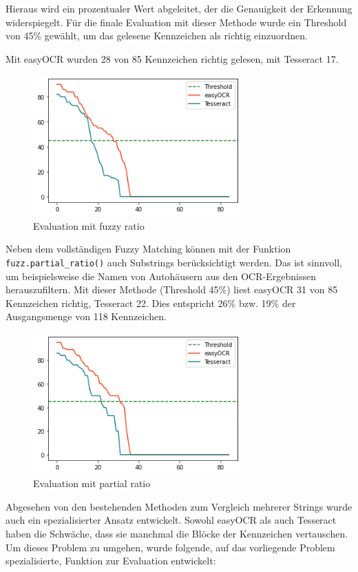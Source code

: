 Hieraus wird ein prozentualer Wert abgeleitet, der die Genauigkeit der Erkennung widerspiegelt.
Für die finale Evaluation mit dieser Methode wurde ein Threshold von 45\% gewählt, um das gelesene Kennzeichen als richtig einzuordnen.

Mit easyOCR wurden 28 von 85 Kennzeichen richtig gelesen, mit Tesseract 17.
\begin{figure}[H]
		\centering
\includegraphics[width=8cm]{./img/evaluation_fuzzy_ratio.png}
\caption{Evaluation mit fuzzy ratio}
\end{figure}


Neben dem vollständigen Fuzzy Matching können mit der Funktion \lstinline{fuzz.partial_ratio()} auch Substrings berücksichtigt werden.
Das ist sinnvoll, um beispielsweise die Namen von Autohäusern aus den OCR-Ergebnissen herauszufiltern.
Mit dieser Methode (Threshold 45\%) liest easyOCR 31 von 85 Kennzeichen richtig, Tesseract 22. Dies entspricht 26\% bzw. 19\% der Ausgangsmenge von 118 Kennzeichen.
\begin{figure}[H]
		\centering
\includegraphics[width=8cm]{./img/evaluation_partial_ratio.png}
\caption{Evaluation mit partial ratio}
\end{figure}


Abgesehen von den bestehenden Methoden zum Vergleich mehrerer Strings wurde auch ein spezialisierter Ansatz entwickelt. Sowohl easyOCR als auch Tesseract haben die Schwäche, dass sie manchmal die Blöcke der Kennzeichen vertauschen. Um dieses Problem zu umgehen, wurde folgende, auf das vorliegende Problem spezialisierte, Funktion zur Evaluation entwickelt:

